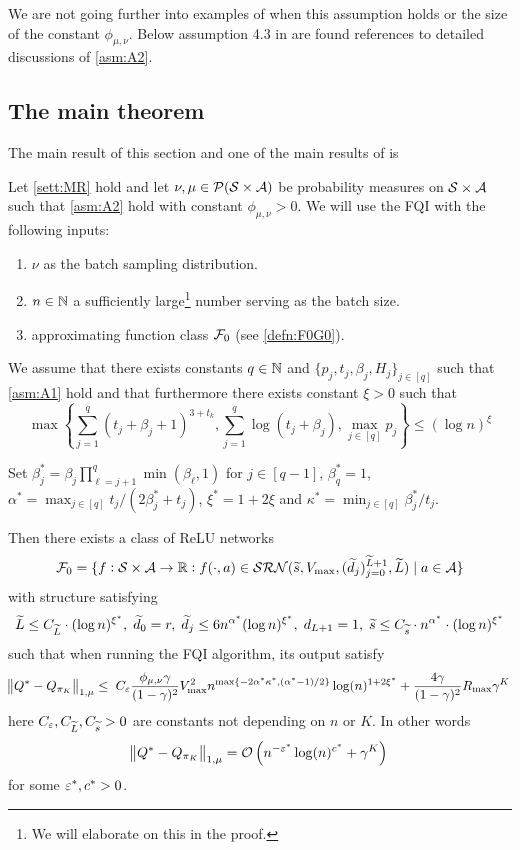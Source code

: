 We are not going further into examples of when this assumption holds
or the size of the constant $\phi_{\mu, \nu}$.
Below assumption 4.3 in  are found references to detailed discussions
of \cref{asm:A2}.

\subsection{The main theorem}

The main result of this section and one of the main results of  is

\begin{thm} \label{thm:main}
  Let \cref{sett:MR} hold and let
  $\nu, \mu \in \mathcal{P}(\mathcal{S} \times \mathcal{A})$ be probability
  measures on $\mathcal{S} \times \mathcal{A}$ such that
  \cref{asm:A2} hold with constant $\phi_{\mu, \nu} > 0$.
  We will use the FQI with the following inputs:
  \begin{enumerate}
    \item $\nu$ as the batch sampling distribution.
    \item $n \in \mathbb{N}$ a sufficiently
      large\footnote{We will elaborate on this in the proof.}
      number serving as the batch size.
    \item approximating function class $\mathcal{F}_0$ (see \cref{defn:F0G0}).
  \end{enumerate}
  We assume that there exists constants
  $q \in \mathbb{N}$ and
  $\{p_j, t_j, \beta_j, H_j\}_{j \in [q]}$
  such that \cref{asm:A1} hold and that furthermore
  there exists constant $\xi > 0$
  such that
  \[ \max \left\{ \sum_{j=1}^q (t_j + \beta_j + 1)^{3 + t_k},
      \sum_{j=1}^q \log (t_j + \beta_j),
      \max_{j \in [q]} p_j
  \right\} \leq (\log n)^\xi \] 

  Set $\beta^*_j = \beta_j \prod_{\ell = j+1}^q \min(\beta_\ell, 1)$
  for $j\in [q-1]$, $\beta^*_q = 1$,
  $\alpha^* = \max_{j \in [q]} t_j/(2\beta^*_j + t_j)$, 
  $\xi^* = 1 + 2\xi$ and $\kappa^* = \min_{j\in [q]} \beta^*_j/t_j$.

  Then there exists a class of ReLU networks
  \[ \mathcal{F}_0 = \{f : \mathcal{S} \times \mathcal{A} \to \mathbb{R} : f(\cdot, a) \in 
  \mathcal{SRN}(\widetilde{s}, V_{\max}, (\widetilde{d}_j)_{j=0}^{\widetilde{L}+1}, \widetilde{L})
  \mid a \in \mathcal{A} \} \]
  with structure satisfying
  \[ \widetilde{L} \leq C_{\widetilde{L}} \cdot (\log n)^{\xi^*},\;
    \widetilde{d}_0 = r,\; \widetilde{d}_j \leq 6 n^{\alpha^*} (\log n)^{\xi^*},\;
    d_{L+1} = 1,\;
  \widetilde{s} \leq C_{\widetilde{s}} \cdot n^{\alpha^*} \cdot (\log n)^{\xi^*} \]
  such that when running the FQI algorithm, its output satisfy
  \[ \norm{Q^* - Q_{\pi_K}}_{1, \mu} \leq \;
    C_{\varepsilon} \frac{\phi_{\mu, \nu} \gamma}{(1-\gamma)^2} V_{\max}^2
    n^{\max\{-2\alpha^*\kappa^*, (\alpha^*  - 1)/2 \}} \log(n)^{1+2\xi^*}
    + \frac{4 \gamma}{(1-\gamma)^2} R_{\max} \gamma^K
  \]
  here $C_{\varepsilon}, C_{\widetilde{L}}, C_{\widetilde{s}}>0$ are constants
  not depending on $n$ or $K$.
  In other words
  \[ \norm{Q^* - Q_{\pi_K}}_{1, \mu} =
  \mathcal{O}\left( n^{-\varepsilon^*} \log(n)^{c^*} + \gamma^K \right) \]
  for some $\varepsilon^*, c^* > 0$.
\end{thm}


